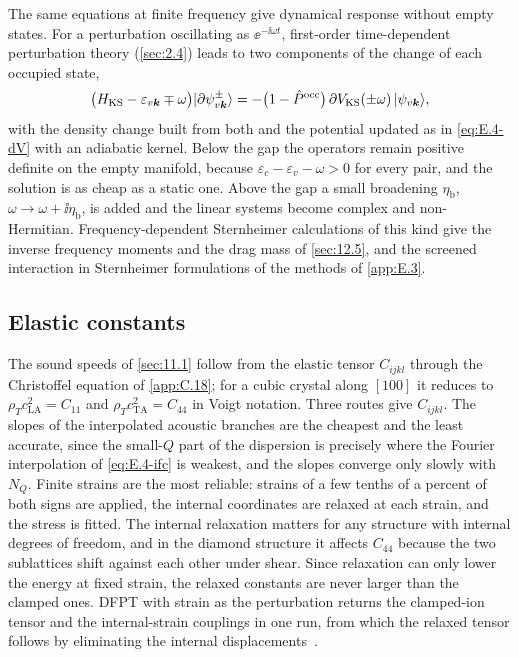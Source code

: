 The same equations at finite frequency give dynamical response without empty states. For a perturbation oscillating as $\ee^{-\ii\omega t}$, first-order time-dependent perturbation theory (\cref{sec:2.4}) leads to two components of the change of each occupied state,
\begin{equation}
  \bigl(H_{\mathrm{KS}} - \varepsilon_{v\bm{k}} \mp \omega\bigr)|\partial\psi^{\pm}_{v\bm{k}}\rangle = -\bigl(1 - \hat{P}^{\mathrm{occ}}\bigr)\,\partial V_{\mathrm{KS}}(\pm\omega)\,|\psi_{v\bm{k}}\rangle ,
  \label{eq:E.4-sthw}
\end{equation}
with the density change built from both and the potential updated as in \cref{eq:E.4-dV} with an adiabatic kernel. Below the gap the operators remain positive definite on the empty manifold, because $\varepsilon_c - \varepsilon_v - \omega > 0$ for every pair, and the solution is as cheap as a static one. Above the gap a small broadening $\eta_{\mathrm{b}}$, $\omega \to \omega + \ii\eta_{\mathrm{b}}$, is added and the linear systems become complex and non-Hermitian. Frequency-dependent Sternheimer calculations of this kind give the inverse frequency moments and the drag mass of \cref{sec:12.5}, and the screened interaction in Sternheimer formulations of the methods of \cref{app:E.3}.

\subsection{Elastic constants}

The sound speeds of \cref{sec:11.1} follow from the elastic tensor $C_{ijkl}$ through the Christoffel equation of \cref{app:C.18}; for a cubic crystal along $[100]$ it reduces to $\rho_T c_{\mathrm{LA}}^2 = C_{11}$ and $\rho_T c_{\mathrm{TA}}^2 = C_{44}$ in Voigt notation. Three routes give $C_{ijkl}$. The slopes of the interpolated acoustic branches are the cheapest and the least accurate, since the small-$Q$ part of the dispersion is precisely where the Fourier interpolation of \cref{eq:E.4-ifc} is weakest, and the slopes converge only slowly with $N_Q$. Finite strains are the most reliable: strains of a few tenths of a percent of both signs are applied, the internal coordinates are relaxed at each strain, and the stress is fitted. The internal relaxation matters for any structure with internal degrees of freedom, and in the diamond structure it affects $C_{44}$ because the two sublattices shift against each other under shear. Since relaxation can only lower the energy at fixed strain, the relaxed constants are never larger than the clamped ones. DFPT with strain as the perturbation returns the clamped-ion tensor and the internal-strain couplings in one run, from which the relaxed tensor follows by eliminating the internal displacements~\cite[Sect.~II.E.1]{baroni2001phonons}.

